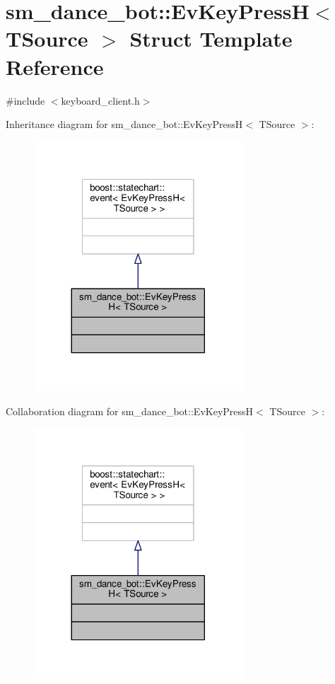 \hypertarget{structsm__dance__bot_1_1EvKeyPressH}{}\section{sm\+\_\+dance\+\_\+bot\+:\+:Ev\+Key\+PressH$<$ T\+Source $>$ Struct Template Reference}
\label{structsm__dance__bot_1_1EvKeyPressH}


{\ttfamily \#include $<$keyboard\+\_\+client.\+h$>$}



Inheritance diagram for sm\+\_\+dance\+\_\+bot\+:\+:Ev\+Key\+PressH$<$ T\+Source $>$\+:
\nopagebreak
\begin{figure}[H]
\begin{center}
\leavevmode
\includegraphics[width=221pt]{structsm__dance__bot_1_1EvKeyPressH__inherit__graph}
\end{center}
\end{figure}


Collaboration diagram for sm\+\_\+dance\+\_\+bot\+:\+:Ev\+Key\+PressH$<$ T\+Source $>$\+:
\nopagebreak
\begin{figure}[H]
\begin{center}
\leavevmode
\includegraphics[width=221pt]{structsm__dance__bot_1_1EvKeyPressH__coll__graph}
\end{center}
\end{figure}


